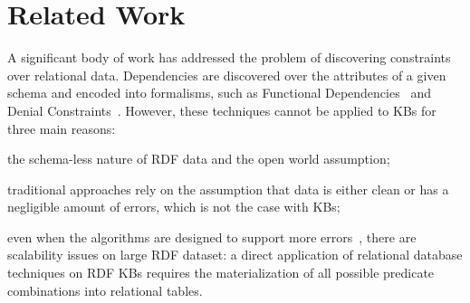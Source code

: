 \section{Related Work} \label{sec:krd_related}


A significant body of work has addressed the problem of discovering constraints over relational data. 
Dependencies are discovered over the attributes of a given schema and encoded into formalisms, such as 
Functional Dependencies~\cite{abiteboul1995foundations} %
and Denial Constraints~\cite{chu2013discovering}. 
%
%
However, these techniques cannot be applied to KBs for three main reasons:
\begin{inparaenum}[\itshape(i)]
	\item the schema-less nature of RDF data and the open world assumption; %
	\item traditional approaches rely on the assumption that data is either clean or has a negligible amount of errors, which is not the case with KBs;
	\item even when the algorithms are designed to support more errors~\cite{abedjan2015temporal,kivinen1995approximate}, there are scalability issues on large RDF dataset: a direct application of relational database techniques on RDF KBs requires the materialization of all possible predicate combinations into relational tables.
\end{inparaenum}
